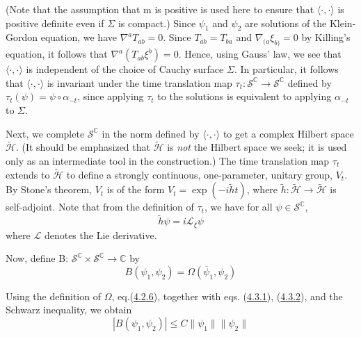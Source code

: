 \documentclass[11pt,a4paper]{article}
\begin{document}
(Note that the assumption that m is positive is used here to ensure that \(\langle\cdot,\cdot\rangle\) is positive definite even if \(\Sigma\) is compact.) Since \(\psi_1\) and \(\psi_2\) are solutions of the Klein-Gordon equation, we have \(\nabla^a T_{ab} = 0\). Since \(T_{ab} = T_{ba}\) and \(\nabla_{(a} \xi_{b)} = 0\) by Killing's equation, it follows that \(\nabla^a (T_{ab} \xi^b) = 0\). Hence, using Gauss' law, we see that \(\langle\cdot,\cdot\rangle\) is independent of the choice of Cauchy surface \(\Sigma\). In particular, it follows that \(\langle\cdot,\cdot\rangle\) is invariant under the time translation map \(\tau_t \colon \mathcal{S}^{ \mathbb{C}} \to \mathcal{S}^{ \mathbb{C}}\) defined by \(\tau_t(\psi) = \psi\circ\alpha_{-t}\), since applying \(\tau_t\) to the solutions is equivalent to applying \(\alpha_{-t}\) to \(\Sigma\).

Next, we complete \(\mathcal{S}^{\mathbb{C}}\) in the norm defined by \(\langle\cdot,\cdot\rangle\) to get a complex Hilbert space \(\widetilde{\mathcal{H}}\). (It should be emphasized that \(\widetilde{\mathcal{H}}\) is \emph{not} the Hilbert space we seek; it is used only as an intermediate tool in the construction.) The time translation map \(\tau_t\) extends to \(\widetilde{\mathcal{H}}\) to define a strongly continuous, one-parameter, unitary group, \(V_t\). By Stone's theorem, \(V_t\) is of the form \(V_t = \exp(-i\widetilde{h}t)\), where \(\widetilde{h} \colon \widetilde{\mathcal{H}} \to \widetilde{\mathcal{H}}\) is self-adjoint. Note that from the definition of \(\tau_t\), we have for all \(\psi \in \mathcal{S}^{\mathbb{C}}\),
\begin{equation*}
\tilde{h} \psi = i \mathcal{L}_{\xi} \psi \tag{4.3.5}\label{eq:4.3.5}
\end{equation*}
where \(\mathcal{L}\) denotes the Lie derivative.

Now, define B: \(\mathcal{S}^{\mathbb{C}} \times \mathcal{S}^{\mathbb{C}} \to \mathbb{C}\) by
\begin{equation*}
B(\psi_1,\psi_2) = \Omega(\overline{\psi}_1, \psi_2) \tag{4.3.6}\label{eq:4.3.6}
\end{equation*}

Using the definition of \(\Omega\), eq.(\hyperref[eq:4.2.6]{4.2.6}), together with eqs. (\hyperref[eq:4.3.1]{4.3.1}), (\hyperref[eq:4.3.2]{4.3.2}), and the Schwarz inequality, we obtain
\begin{equation*}
|B(\psi_1, \psi_2)| \le C \|\psi_1\| \|\psi_2\| \tag{4.3.7}\label{eq:4.3.7}
\end{equation*}
\end{document}
